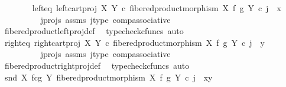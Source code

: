 \begin{isabellebody}
\isanewline
\ \ \ \ \ \ \isamarkupfalse%
\ left{\isacharunderscore}{\kern0pt}eq{\isacharcolon}{\kern0pt}\ {\isachardoublequoteopen}left{\isacharunderscore}{\kern0pt}cart{\isacharunderscore}{\kern0pt}proj\ X\ Y\ {\isasymcirc}\isactrlsub c\ fibered{\isacharunderscore}{\kern0pt}product{\isacharunderscore}{\kern0pt}morphism\ X\ f\ g\ Y\ {\isasymcirc}\isactrlsub c\ j\ {\isacharequal}{\kern0pt}\ x{\isachardoublequoteclose}\isanewline
\ \ \ \ \ \ \ \ \isamarkupfalse%
\ j{\isacharunderscore}{\kern0pt}projs\ assms\ j{\isacharunderscore}{\kern0pt}type\ comp{\isacharunderscore}{\kern0pt}associative{}\isanewline
\ \ \ \ \ \ \ \ \isamarkupfalse%
\ fibered{\isacharunderscore}{\kern0pt}product{\isacharunderscore}{\kern0pt}left{\isacharunderscore}{\kern0pt}proj{\isacharunderscore}{\kern0pt}def\ \isamarkupfalse%
\ {\isacharparenleft}{\kern0pt}typecheck{\isacharunderscore}{\kern0pt}cfuncs{\isacharcomma}{\kern0pt}\ auto{\isacharparenright}{\kern0pt}\isanewline
\isanewline
\ \ \ \ \ \ \isamarkupfalse%
\ right{\isacharunderscore}{\kern0pt}eq{\isacharcolon}{\kern0pt}\ {\isachardoublequoteopen}right{\isacharunderscore}{\kern0pt}cart{\isacharunderscore}{\kern0pt}proj\ X\ Y\ {\isasymcirc}\isactrlsub c\ fibered{\isacharunderscore}{\kern0pt}product{\isacharunderscore}{\kern0pt}morphism\ X\ f\ g\ Y\ {\isasymcirc}\isactrlsub c\ j\ {\isacharequal}{\kern0pt}\ y{\isachardoublequoteclose}\isanewline
\ \ \ \ \ \ \ \ \isamarkupfalse%
\ j{\isacharunderscore}{\kern0pt}projs\ assms\ j{\isacharunderscore}{\kern0pt}type\ comp{\isacharunderscore}{\kern0pt}associative{}\isanewline
\ \ \ \ \ \ \ \ \isamarkupfalse%
\ fibered{\isacharunderscore}{\kern0pt}product{\isacharunderscore}{\kern0pt}right{\isacharunderscore}{\kern0pt}proj{\isacharunderscore}{\kern0pt}def\ \isamarkupfalse%
\ {\isacharparenleft}{\kern0pt}typecheck{\isacharunderscore}{\kern0pt}cfuncs{\isacharcomma}{\kern0pt}\ auto{\isacharparenright}{\kern0pt}\isanewline
\isanewline
\ \ \ \ \ \ \isamarkupfalse%
\ {\isachardoublequoteopen}snd\ {\isacharparenleft}{\kern0pt}X\ \isactrlbsub f\isactrlesub {\isasymtimes}\isactrlsub c\isactrlbsub g\isactrlesub \ Y{\isacharcomma}{\kern0pt}\ fibered{\isacharunderscore}{\kern0pt}product{\isacharunderscore}{\kern0pt}morphism\ X\ f\ g\ Y{\isacharparenright}{\kern0pt}\ {\isasymcirc}\isactrlsub c\ j\ {\isacharequal}{\kern0pt}\ {\isasymlangle}x{\isacharcomma}{\kern0pt}y{\isasymrangle}{\isachardoublequoteclose}\isanewline
\ \ \ \ \ \ \ \ \isamarkupfalse%

\end{isabellebody}
